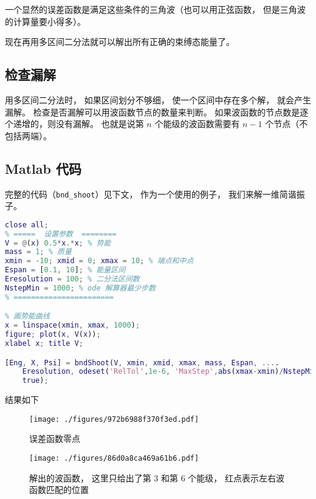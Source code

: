 一个显然的误差函数是满足这些条件的三角波（也可以用正弦函数， 但是三角波的计算量要小得多）。

现在再用多区间二分法就可以解出所有正确的束缚态能量了。

\subsection{检查漏解}
用多区间二分法时， 如果区间划分不够细， 使一个区间中存在多个解， 就会产生漏解。 检查是否漏解可以用波函数节点的数量来判断。 如果波函数的节点数是逐个递增的，则没有漏解。 也就是说第 $n$ 个能级的波函数需要有 $n - 1$ 个节点（不包括两端）。

\subsection{Matlab 代码}

完整的代码（\verb|bnd_shoot|）见下文， 作为一个使用的例子， 我们来解一维简谐振子。

\begin{lstlisting}[language=matlab, caption=bndShootDemo.m]
close all;
% =====  设置参数  ========
V = @(x) 0.5*x.*x; % 势能
mass = 1; % 质量
xmin = -10; xmid = 0; xmax = 10; % 端点和中点
Espan = [0.1, 10]; % 能量区间
Eresolution = 100; % 二分法区间数
NstepMin = 1000; % ode 解算器最少步数
% =======================

% 画势能曲线
x = linspace(xmin, xmax, 1000);
figure; plot(x, V(x));
xlabel x; title V;

[Eng, X, Psi] = bndShoot(V, xmin, xmid, xmax, mass, Espan, ....
    Eresolution, odeset('RelTol',1e-6, 'MaxStep',abs(xmax-xmin)/NstepMin),...
    true);
\end{lstlisting}

结果如下
\begin{figure}[ht]
\centering
\texttt{[image: ./figures/972b6988f370f3ed.pdf]}
\caption{误差函数零点} \label{fig_BndSho_1}
\end{figure}

\begin{figure}[ht]
\centering
\texttt{[image: ./figures/86d0a8ca469a61b6.pdf]}
\caption{解出的波函数， 这里只给出了第 3 和第 6 个能级， 红点表示左右波函数匹配的位置} \label{fig_BndSho_2}
\end{figure}

